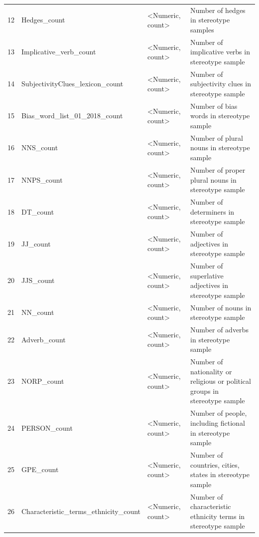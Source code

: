 \begin{table}[]
{\begin{tabular}{@{}llll@{}}
12 & Hedges\_count            & \textless{}Numeric, count\textgreater{} & Number of hedges in stereotype samples                     \\
13 & Implicative\_verb\_count & \textless{}Numeric, count\textgreater{} & Number of implicative verbs in stereotype sample           \\
14 & SubjectivityClues\_lexicon\_count        & \textless{}Numeric, count\textgreater{} & Number of subjectivity clues in stereotype sample                           \\
15 & Bias\_word\_list\_01\_2018\_count        & \textless{}Numeric, count\textgreater{} & Number of bias words in stereotype sample                                   \\
16 & NNS\_count               & \textless{}Numeric, count\textgreater{} & Number of plural nouns in stereotype sample                \\
17 & NNPS\_count              & \textless{}Numeric, count\textgreater{} & Number of proper plural nouns in stereotype sample         \\
18 & DT\_count                & \textless{}Numeric, count\textgreater{} & Number of determiners in stereotype sample                 \\
19 & JJ\_count                & \textless{}Numeric, count\textgreater{} & Number of adjectives in stereotype sample                  \\
20 & JJS\_count               & \textless{}Numeric, count\textgreater{} & Number of superlative adjectives in stereotype sample      \\
21 & NN\_count                & \textless{}Numeric, count\textgreater{} & Number of nouns in stereotype sample                       \\
22 & Adverb\_count            & \textless{}Numeric, count\textgreater{} & Number of adverbs in stereotype sample                     \\
23 & NORP\_count                              & \textless{}Numeric, count\textgreater{} & Number of nationality or religious or political groups in stereotype sample \\
24 & PERSON\_count            & \textless{}Numeric, count\textgreater{} & Number of people, including fictional in stereotype sample \\
25 & GPE\_count               & \textless{}Numeric, count\textgreater{} & Number of countries, cities, states in stereotype sample   \\
26 & Characteristic\_terms\_ethnicity\_count  & \textless{}Numeric, count\textgreater{} & Number of characteristic ethnicity terms in stereotype sample               \\

\end{tabular}}
\end{table}
